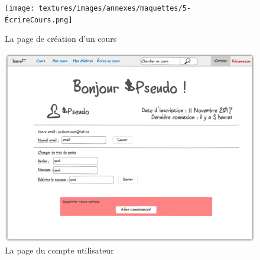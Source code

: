 \begin{figure}[!h]
    \centering
    \texttt{[image: textures/images/annexes/maquettes/5-ÉcrireCours.png]}
    \caption{La page de création d'un cours}
\end{figure}
\begin{figure}[!h]
    \centering
    \includegraphics[scale=1]{textures/images/annexes/maquettes/6-Compte(utilisateur).png}
    \caption{La page du compte utilisateur}
\end{figure}